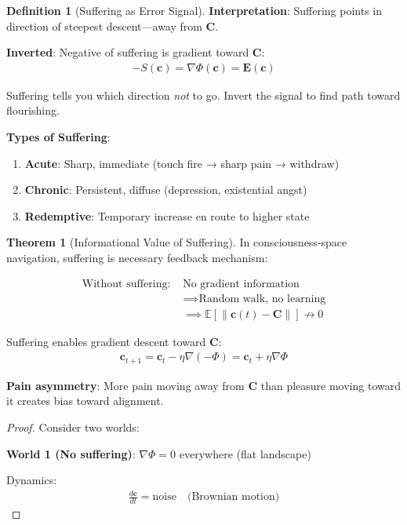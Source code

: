 \documentclass[11pt,a4paper]{article}
\theoremstyle{definition}
\newtheorem{definition}{Definition}[section]
\newtheorem{theorem}{Theorem}[section]
\theoremstyle{remark}
\newcommand{\EE}{\mathbf{E}}
\newcommand{\cc}{\mathbf{c}}
\begin{document}
\begin{small}
\begin{enumerate}
\begin{definition}[Suffering as Error Signal]
\textbf{Interpretation}: Suffering points in direction of steepest descent—away from \(\mathbf{C}\).

\textbf{Inverted}: Negative of suffering is gradient toward \(\mathbf{C}\):
\begin{align}
-S(\cc) = \nabla \Phi(\cc) = \EE(\cc)
\end{align}

Suffering tells you which direction \textit{not} to go. Invert the signal to find path toward flourishing.

\textbf{Types of Suffering}:
\begin{enumerate}
    \item \textbf{Acute}: Sharp, immediate (touch fire → sharp pain → withdraw)
    \item \textbf{Chronic}: Persistent, diffuse (depression, existential angst)
    \item \textbf{Redemptive}: Temporary increase en route to higher state
\end{enumerate}
\end{definition}

\begin{theorem}[Informational Value of Suffering]
In consciousness-space navigation, suffering is necessary feedback mechanism:

\begin{align}
\text{Without suffering: } &\text{No gradient information} \\
&\implies \text{Random walk, no learning} \\
&\implies \mathbb{E}[\|\cc(t) - \mathbf{C}\|] \not\to 0
\end{align}

Suffering enables gradient descent toward \(\mathbf{C}\):
\begin{align}
\cc_{t+1} = \cc_t - \eta \nabla(-\Phi) = \cc_t + \eta \nabla \Phi
\end{align}

\textbf{Pain asymmetry}: More pain moving away from \(\mathbf{C}\) than pleasure moving toward it creates bias toward alignment.
\end{theorem}

\begin{proof}
Consider two worlds:

\textbf{World 1 (No suffering)}: \(\nabla \Phi = 0\) everywhere (flat landscape)

Dynamics:
\begin{align}
\frac{d\cc}{dt} = \text{noise} \quad \text{(Brownian motion)}
\end{align}


\end{proof}
\end{enumerate}
\end{small}
\end{document}
